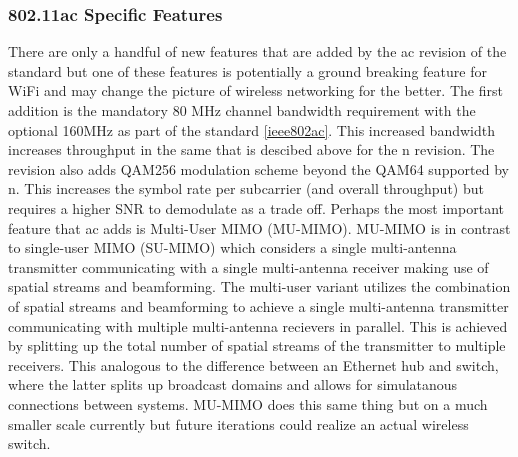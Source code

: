 \subsubsection{802.11ac Specific Features}

There are only a handful of new features that are added by the ac revision of the standard but one of these features is potentially a ground breaking feature for WiFi and may change the picture of wireless networking for the better. The first addition is the mandatory 80 MHz channel bandwidth requirement with the optional 160MHz as part of the standard \ref{ieee802ac}. This increased bandwidth increases throughput in the same that is descibed above for the n revision. The revision also adds QAM256 modulation scheme beyond the QAM64 supported by n. This increases the symbol rate per subcarrier (and overall throughput) but requires a higher SNR to demodulate as a trade off. Perhaps the most important feature that ac adds is Multi-User MIMO (MU-MIMO). MU-MIMO is in contrast to single-user MIMO (SU-MIMO) which considers a single multi-antenna transmitter communicating with a single multi-antenna receiver making use of spatial streams and beamforming. The multi-user variant utilizes the combination of spatial streams and beamforming to achieve a single multi-antenna transmitter communicating with multiple multi-antenna recievers in parallel. This is achieved by splitting up the total number of spatial streams of the transmitter to multiple receivers. This analogous to the difference between an Ethernet hub and switch, where the latter splits up broadcast domains and allows for simulatanous connections between systems. MU-MIMO does this same thing but on a much smaller scale currently but future iterations could realize an actual wireless switch.
